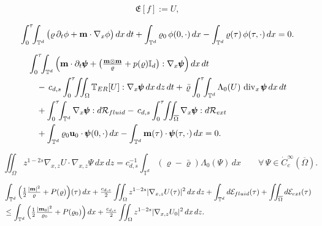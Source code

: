 \documentclass[10pt,a4paper]{amsart}
\newcommand{\Div}{\operatorname{div}}
\newcommand{\Grad}{\nabla}
\newcommand{\vc}[1]{{\bf #1}}
\newcommand{\vm}{\vc{m}}
\newcommand{\vr}{\varrho}
\newcommand{\vu}{\vc{u}}
\begin{document}
	\begin{align}\label{Not:CSext}
			\mathfrak E[f]:=U,
	\end{align}

			\begin{equation}\label{eq:w-ERc}
				\int_0^{\tau}\!\!\int_{\mathbb T^d}\big(\vr\,\partial_t\phi+\vm\cdot\Grad_x\phi\big)\,dx\,dt
				+\int_{\mathbb T^d}\vr_0\,\phi(0,\cdot)\,dx- \int_{\mathbb T^d}\vr(\tau)\,\phi(\tau,\cdot)\,dx=0.
			\end{equation}

		\begin{equation}\label{eq:w-ERm}
			\begin{aligned}
				&\int_0^\tau\!\!\int_{\mathbb T^d}\Big(\vm\cdot\partial_t\pmb\psi
				+\big(\tfrac{\vm\otimes\vm}{\vr}+p(\vr)\mathbb I_d\big):\Grad_x\pmb\psi\Big)\,dx\,dt\\
				&\quad -\,c_{d,s}\int_0^\tau\!\!\iint_\Omega \mathbb T_{\rm ER}[U]:\Grad_x\pmb\psi\,dx\,dz\,dt
				+\,\bar\vr\int_0^\tau\!\!\int_{\mathbb T^d}\Lambda_0(U)\,\Div_x\pmb\psi\,dx\,dt\\
				&\quad +\int_0^\tau\!\!\int_{\mathbb T^d}\Grad_x\pmb\psi:d\mathcal R_{fluid}
				-\,c_{d,s}\int_0^\tau\!\!\iint_{\overline\Omega}\Grad_x\pmb\psi:d\mathcal R_{ext}\\
				&\quad +\int_{\mathbb T^d}\vr_0\vu_0\cdot\pmb\psi(0,\cdot)\,dx
				-\int_{\mathbb T^d}\vm(\tau)\cdot\pmb\psi(\tau,\cdot)\,dx
				= 0 .
			\end{aligned}
		\end{equation}

			\begin{equation}\label{eq:w-ext}
				\iint_\Omega z^{1-2s}\Grad_{x,z}U\cdot\Grad_{x,z}\Psi\,dx\,dz
				=c_{d,s}^{-1}\int_{\mathbb T^d}(\vr-\bar\vr)\Lambda_0(\Psi)\,dx
				\qquad\forall\,\Psi\in\dot C_c^\infty(\overline\Omega).
			\end{equation}

			\begin{equation}\label{eq:ei}
				\begin{aligned}
					&\int_{\mathbb T^d}\Big(\tfrac12\tfrac{|\vm|^2}{\vr}+P(\vr)\Big)(\tau)\,dx
					+\tfrac{c_{d,s}}2\iint_\Omega z^{1-2s}|\Grad_{x,z}U(\tau)|^2\,dx\,dz
					+\int_{\mathbb T^d}d\mathcal E_{fluid}(\tau)+\iint_{\overline\Omega}d\mathcal E_{ext}(\tau)\\
					&\le \int_{\mathbb T^d}\Big(\tfrac12\tfrac{|\vm_0|^2}{\vr_0}+P(\vr_0)\Big)\,dx
					+\tfrac{c_{d,s}}2\iint_\Omega z^{1-2s}|\Grad_{x,z}U_0|^2\,dx\,dz .
				\end{aligned}
			\end{equation}
\end{document}
